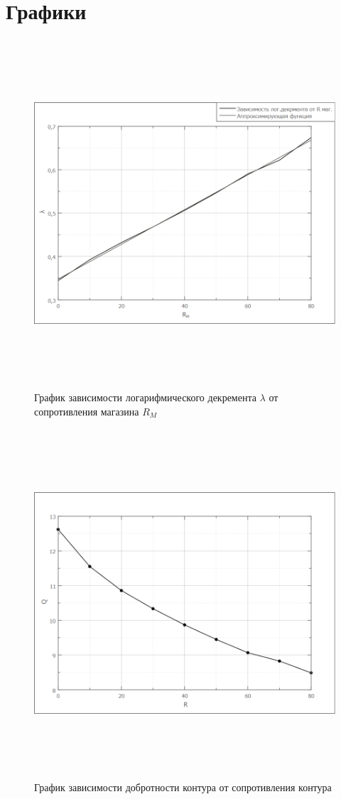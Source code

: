 \documentclass[14pt]{extarticle}
\begin{document}
    \newpage
    \section{Графики}
    \begin{figure}[h!]
        \centering
        \includegraphics[height=13cm]{img/plot.png}
        \caption{График зависимости логарифмического декремента $\lambda$ от сопротивления магазина $R_M$}
    \end{figure}
    \newpage
    \begin{figure}[h!]
        \centering
        \includegraphics[height=13cm]{img/plot2.png}
        \caption{График зависимости добротности контура от сопротивления контура}
    \end{figure}
\end{document}
